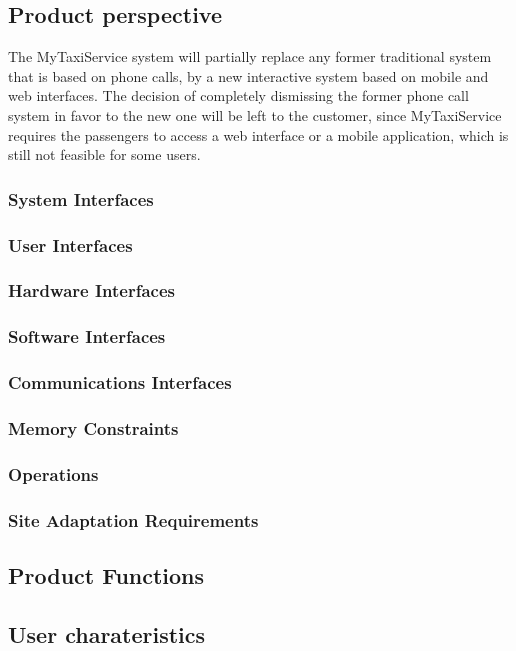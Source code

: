 \documentclass[11pt, a4paper,titlepage]{article}
\newcommand{\productname}{MyTaxiService }
\begin{document}
\subsection{Product perspective}
The \productname system will partially replace any former traditional system that is based on phone calls, by a new interactive system based on mobile and web interfaces. \newline
The decision of completely dismissing the former phone call system in favor to the new one will be left to the customer, since \productname requires the passengers to access a web interface or a mobile application, which is still not feasible for some users.
\subsubsection{System Interfaces}
\subsubsection{User Interfaces}
\subsubsection{Hardware Interfaces}
\subsubsection{Software Interfaces}
\subsubsection{Communications Interfaces}
\subsubsection{Memory Constraints}
\subsubsection{Operations}
\subsubsection{Site Adaptation Requirements}
\subsection{Product Functions}
\subsection{User charateristics}
\end{document}
